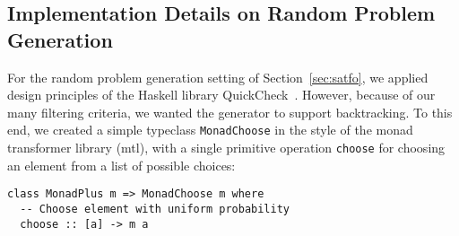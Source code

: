 \subsection{Implementation Details on Random Problem Generation}\label{appB:SAT}











For the random problem generation setting of Section~\ref{sec:satfo},
we applied design principles of the Haskell library
QuickCheck~\cite{ClaessenHughes:2000:QuickCheck}.
However, because of our many filtering criteria, we wanted the generator to support backtracking.
To this end,
we created a simple typeclass \texttt{MonadChoose} in the style of the monad transformer library (mtl),
with a single primitive operation \texttt{choose} for choosing an element from a list of possible choices:
\begin{lstlisting}
class MonadPlus m => MonadChoose m where
  -- Choose element with uniform probability
  choose :: [a] -> m a
\end{lstlisting}

